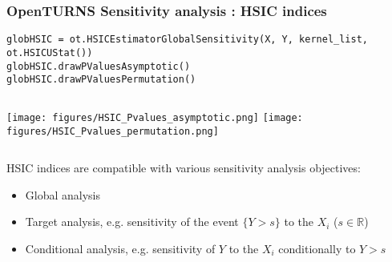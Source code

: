 \documentclass{beamer}
\begin{document}
\begin{frame}[containsverbatim]
\frametitle{OpenTURNS Sensitivity analysis : HSIC indices}

\begin{lstlisting}
globHSIC = ot.HSICEstimatorGlobalSensitivity(X, Y, kernel_list, ot.HSICUStat())
globHSIC.drawPValuesAsymptotic()
globHSIC.drawPValuesPermutation()
\end{lstlisting}


\begin{columns}
  \texttt{[image: figures/HSIC\_Pvalues\_asymptotic.png]}
  \texttt{[image: figures/HSIC\_Pvalues\_permutation.png]}
\end{columns}

\medskip

\small 
HSIC indices are compatible with various sensitivity analysis objectives:

\begin{itemize}
  \item Global analysis
  \item Target analysis, e.g. sensitivity of the event $\{Y>s\}$ to the $X_i$ ($s \in \mathbb{R}$)
  \item Conditional analysis, e.g. sensitivity of $Y$ to the $X_i$ conditionally to $Y>s$
\end{itemize}
  
\end{frame}
  
\end{document}
